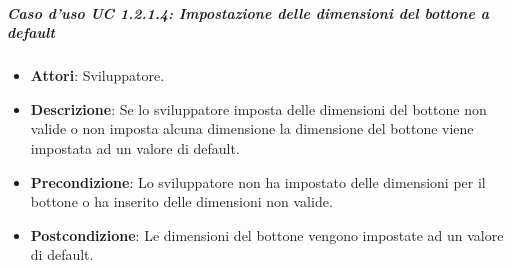 \subparagraph{Caso d'uso UC 1.2.1.4: Impostazione delle dimensioni del bottone a default}

\FloatBarrier
\begin{itemize}
\item\textbf{Attori}: Sviluppatore.
\item\textbf{Descrizione}: Se lo sviluppatore imposta delle dimensioni del bottone non valide o non imposta alcuna dimensione la dimensione del bottone viene impostata ad un valore di default.
\item\textbf{Precondizione}: Lo sviluppatore non ha impostato delle dimensioni per il bottone o ha inserito delle dimensioni non valide.
\item\textbf{Postcondizione}: Le dimensioni del bottone vengono impostate ad un valore di default.
\end{itemize}

